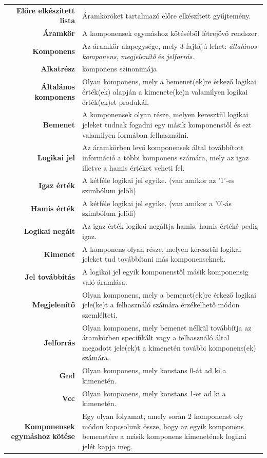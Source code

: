 \begin{longtable}{r p{10.7cm}}
\textbf{Előre elkészített lista} & Áramköröket tartalmazó előre elkészített gyűjtemény. \\
\textbf{Áramkör} & A komponensek egymáshoz kötéséből létrejövő rendszer. \\
\textbf{Komponens} & Az áramkör alapegysége, mely 3 fajtájú lehet: \emph{általános komponens}, \emph{megjelenítő} és \emph{jelforrás}. \\
\textbf{Alkatrész} & komponens szinonimája\\
\textbf{Általános komponens} & Olyan komponens, mely a bemenet(ek)re érkező logikai érték(ek) alapján a kimenete(ke)n valamilyen logikai érték(ek)et produkál.\\
\textbf{Bemenet} & A komponensek olyan része, melyen keresztül logikai jeleket tudnak fogadni egy másik komponenstől és ezt valamilyen formában felhasználni. \\
\textbf{Logikai jel} & Az áramkörben levő komponensek által továbbított információ a többi komponens számára, mely az igaz illetve a hamis értéket veheti fel.\\
\textbf{Igaz érték} & A kétféle logikai jel egyike. (van amikor az '1'-es szimbólum jelöli)\\
\textbf{Hamis érték} & A kétféle logikai jel egyike. (van amikor a '0'-ás szimbólum jelöli)\\
\textbf{Logikai negált} & Az igaz érték logikai negáltja hamis, hamis értéké pedig igaz.\\
\textbf{Kimenet} & A komponens olyan része, melyen keresztül logikai jeleket tud továbbítani más komponenseknek.\\
\textbf{Jel továbbítás} & A logikai jel egyik komponenstől másik komponensig való áramlása.\\
\textbf{Megjelenítő} & Olyan komponens, mely a bemenet(ek)re érkező logikai jele(ke)t a felhasználó számára érzékelhető módon szemlélteti.\\
\textbf{Jelforrás} & Olyan komponens, mely bemenet nélkül továbbítja az áramkörben specifikált vagy a felhasználó által megadott jele(ek)t a kimenetén további komponens(ek) számára. \\
\textbf{Gnd} & Olyan komponens, mely konstans 0-át ad ki a kimenetén. \\
\textbf{Vcc} & Olyan komponens, mely konstans 1-et ad ki a kimenetén. \\
\textbf{Komponensek egymáshoz kötése} & Egy olyan folyamat, amely során 2 komponenst oly módon kapcso\-lunk össze, hogy az egyik komponens bemenetére a másik komponens kimenetének logikai jelét kapja meg.\\

\end{longtable}
